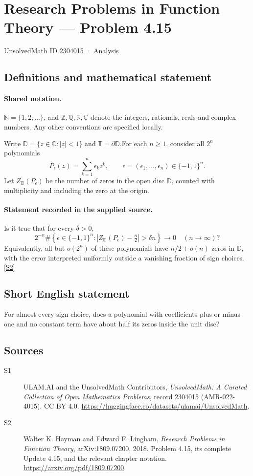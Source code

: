 \documentclass[11pt]{book}
\newcommand{\sref}[2]{\hyperlink{source:#1:#2}{[S#2]}}
\begin{document}
\setcounter{section}{2304014}
\section{Research Problems in Function Theory — Problem 4.15}\label{2304015}
{\small\sffamily UnsolvedMath ID 2304015 · Analysis}
\subsection{Definitions and mathematical statement}

\paragraph{Shared notation.}$\mathbb N=\{1,2,\ldots\}$, and $\mathbb Z,\mathbb Q,\mathbb R,\mathbb C$ denote the integers, rationals, reals and complex numbers. Any other conventions are specified locally.


Write $\mathbb D=\{z\in\mathbb C:|z|<1\}$ and $\mathbb T=\partial\mathbb D$.For each $n\ge1$, consider all $2^n$ polynomials
\[P_\epsilon(z)=\sum_{k=1}^n\epsilon_kz^k,\qquad\epsilon=(\epsilon_1,\ldots,\epsilon_n)\in\{-1,1\}^n.
\]
Let $Z_{\mathbb D}(P_\epsilon)$ be the number of zeros in the open disc $\mathbb D$, counted with multiplicity and including the zero at the origin.
\paragraph{Statement recorded in the supplied source.}
Is it true that for every $\delta>0$,
\[2^{-n}\#\left\{\epsilon\in\{-1,1\}^n:\left|Z_{\mathbb D}(P_\epsilon)-\tfrac n2\right|>\delta n\right\}\longrightarrow0\quad(n\to\infty)?\]
Equivalently, all but $o(2^n)$ of these polynomials have $n/2+o(n)$ zeros in $\mathbb D$, with the error interpreted uniformly outside a vanishing fraction of sign choices. \sref{2304015}{2}
\subsection{Short English statement}
For almost every sign choice, does a polynomial with coefficients plus or minus one and no constant term have about half its zeros inside the unit disc?
\subsection{Sources}
\begin{description}
\item[\hypertarget{source:2304015:1}{S1}] ULAM.AI and the UnsolvedMath Contributors, \emph{UnsolvedMath: A Curated Collection of Open Mathematics Problems}, record 2304015 (AMR-022-4015). CC BY 4.0. \url{https://huggingface.co/datasets/ulamai/UnsolvedMath}.
\item[\hypertarget{source:2304015:2}{S2}] Walter K. Hayman and Edward F. Lingham, \emph{Research Problems in Function Theory}, arXiv:1809.07200, 2018. Problem 4.15, its complete Update 4.15, and the relevant chapter notation. \url{https://arxiv.org/pdf/1809.07200}.
\end{description}
\label{end:2304015}
\end{document}

